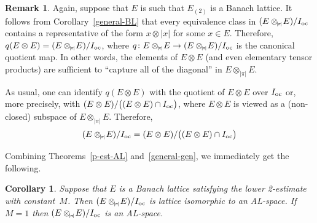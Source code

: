 \documentclass[12pt]{amsart}
\theoremstyle{plain}
\newtheorem{corollary}[theorem]{Corollary}
\theoremstyle{definition}
\newtheorem{remark}[theorem]{Remark}
\newcommand{\abs}[1]{\lvert#1\rvert}
\newcommand{\marg}[1]{\marginpar{\tiny #1}}
\def\api{{\abs{\!\pi\!}}}
\def\ftp{\otimes_{\!\scriptscriptstyle\api}\!}
\def\Ioc{I_{\rm oc}}
\begin{document}
\begin{remark}\label{diag-ExE}
  Again, suppose that $E$ is such that $E_{(2)}$ is a Banach lattice.
  It follows from Corollary~\ref{general-BL} that every equivalence
  class in $(E\ftp E)/\Ioc$ contains a representative of the form
  $x\otimes\abs{x}$ for some $x\in E$.  Therefore, $q(E\otimes
  E)=(E\ftp E)/\Ioc$, where $q\colon E\ftp E\to(E\ftp E)/\Ioc$ is the
  canonical quotient map.  In other words, the elements of $E\otimes
  E$ (and even elementary tensor products) are sufficient to ``capture
  all of the diagonal'' in $E\ftp E$.

  As usual, one can identify $q(E\otimes E)$ with the quotient of
  $E\otimes E$ over $\Ioc$ or, more precisely, with $(E\otimes
  E)/\bigl((E\otimes E)\cap \Ioc\bigr)$, where $E\otimes E$ is viewed
  as a (non-closed) subspace of $E\ftp E$. Therefore,
  \begin{equation}\label{di-ExE}
    (E\ftp E)/\Ioc=
     (E\otimes E)/\bigl((E\otimes E)\cap \Ioc\bigr)
  \end{equation}
\end{remark}

Combining Theorems~\ref{p-est-AL} and~\ref{general-gen}, we
immediately get the following.

\begin{corollary}
  Suppose that $E$ is a Banach lattice satisfying the lower 2-estimate
  with constant~$M$. Then $(E\ftp E)/\Ioc$ is lattice isomorphic to an
  AL-space. If $M=1$ then $(E\ftp E)/\Ioc$ is an AL-space.
\end{corollary}




\end{document}
